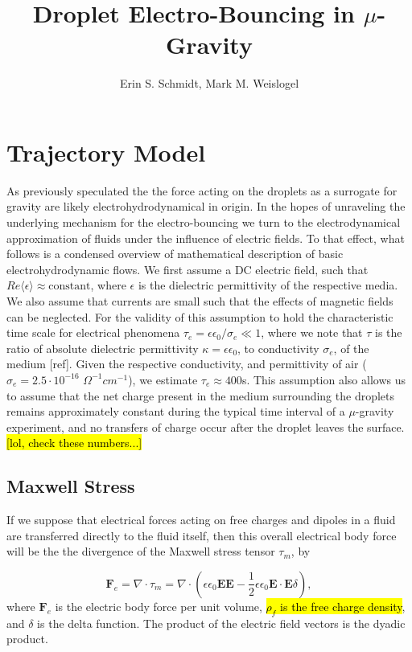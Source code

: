 \documentclass[a4paper, 12pt]{article}
\title{\textsf{\textbf{Droplet Electro-Bouncing in $\mu$-Gravity}}}
\author{Erin S. Schmidt, Mark M. Weislogel}
\date{}
\begin{document}

\doublespacing

\section{Trajectory Model}
As previously speculated the the force acting on the droplets as a surrogate for gravity are likely electrohydrodynamical in origin. In the hopes of unraveling the underlying mechanism for the electro-bouncing we turn to the electrodynamical approximation of fluids under the influence of electric fields. To that effect, what follows is a condensed overview of mathematical description of basic electrohydrodynamic flows. We first assume a DC electric field, such that $Re \langle \epsilon \rangle \approx  \mbox{constant}$, where $\epsilon$ is the dielectric permittivity of the respective media. We also assume that currents are small such that the effects of magnetic fields can be neglected. For the validity of this assumption to hold the characteristic time scale for electrical phenomena $\tau_e = \epsilon \epsilon_0/\sigma_e \ll 1$, where we note that $\tau$ is the ratio of absolute dielectric permittivity $\kappa = \epsilon \epsilon_0$, to conductivity $\sigma_e$, of the medium [ref]. Given the respective conductivity, and permittivity of air ($\sigma_e = 2.5 \cdot 10^{-16}$ $\Omega^{-1} cm^{-1}$), we estimate $\tau_e \approx 400$s. This assumption also allows us to assume that the net charge present in the medium surrounding the droplets remains approximately constant during the typical time interval of a $\mu$-gravity experiment, and no transfers of charge occur after the droplet leaves the surface. \hl{[lol, check these numbers...]}

\subsection{Maxwell Stress}
If we suppose that electrical forces acting on free charges and dipoles in a fluid are transferred directly to the fluid itself, then this overall electrical body force will be the the divergence of the Maxwell stress tensor $\tau_m $, by

\[ \mathbf{F}_e = \nabla \cdot \tau_m = \nabla \cdot \left( \epsilon \epsilon_0 \mathbf{E} \mathbf{E} - \frac{1}{2} \epsilon \epsilon_0 \mathbf{E} \cdot \mathbf{E} \delta \right) ,\]
where $\mathbf{F}_e$ is the electric body force per unit volume, \hl{$\rho_f$ is the free charge density}, and $\delta$ is the delta function. The product of the electric field vectors is the dyadic product.  
\end{document}
